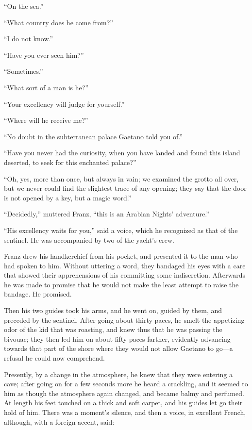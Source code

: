 “On the sea.”

“What country does he come from?”

“I do not know.”

“Have you ever seen him?”

“Sometimes.”

“What sort of a man is he?”

“Your excellency will judge for yourself.”

“Where will he receive me?”

“No doubt in the subterranean palace Gaetano told you of.”

“Have you never had the curiosity, when you have landed and found this
island deserted, to seek for this enchanted palace?”

“Oh, yes, more than once, but always in vain; we examined the grotto
all over, but we never could find the slightest trace of any opening;
they say that the door is not opened by a key, but a magic word.”

“Decidedly,” muttered Franz, “this is an Arabian Nights’ adventure.”

“His excellency waits for you,” said a voice, which he recognized as
that of the sentinel. He was accompanied by two of the yacht’s crew.

Franz drew his handkerchief from his pocket, and presented it to the
man who had spoken to him. Without uttering a word, they bandaged his
eyes with a care that showed their apprehensions of his committing some
indiscretion. Afterwards he was made to promise that he would not make
the least attempt to raise the bandage. He promised.

Then his two guides took his arms, and he went on, guided by them, and
preceded by the sentinel. After going about thirty paces, he smelt the
appetizing odor of the kid that was roasting, and knew thus that he was
passing the bivouac; they then led him on about fifty paces farther,
evidently advancing towards that part of the shore where they would not
allow Gaetano to go—a refusal he could now comprehend.

Presently, by a change in the atmosphere, he knew that they were
entering a cave; after going on for a few seconds more he heard a
crackling, and it seemed to him as though the atmosphere again changed,
and became balmy and perfumed. At length his feet touched on a thick
and soft carpet, and his guides let go their hold of him. There was a
moment’s silence, and then a voice, in excellent French, although, with
a foreign accent, said:

